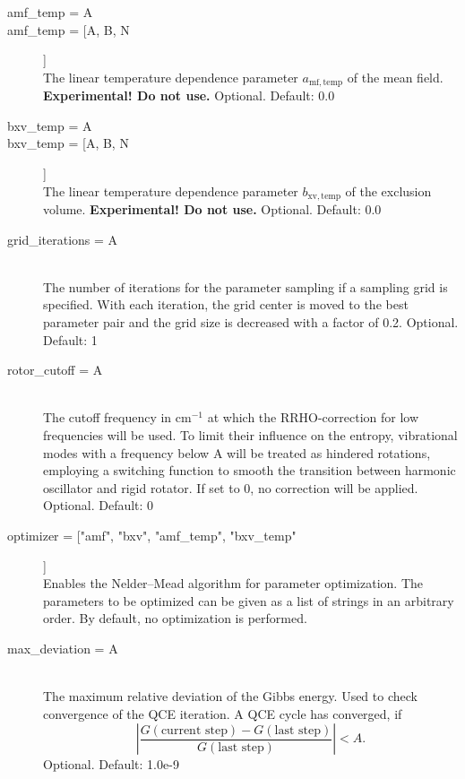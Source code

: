 \documentclass{scrartcl}
\begin{document}
\begin{description}
    \item[amf\_temp = A]
    \item[amf\_temp = [A, B, N]] \hfill \\
        The linear temperature dependence parameter $a_\mathrm{mf,temp}$ of the mean field.
        \textbf{Experimental! Do not use.}
        Optional. Default: 0.0
        \vspace{0.1cm}
    \item[bxv\_temp = A]
    \item[bxv\_temp = [A, B, N]] \hfill \\
        The linear temperature dependence parameter $b_\mathrm{xv,temp}$ of the exclusion volume.
        \textbf{Experimental! Do not use.}
        Optional. Default: 0.0
        \vspace{0.1cm}
    \item[grid\_iterations = A] \hfill \\
        The number of iterations for the parameter sampling if a sampling grid is specified.
        With each iteration, the grid center is moved to the best parameter pair and the grid size is decreased 
        with a factor of 0.2.
        Optional. Default: 1
    \item[rotor\_cutoff = A] \hfill \\
        The cutoff frequency in cm$^{-1}$ at which the RRHO-correction for low frequencies will be used.
        To limit their influence on the entropy, vibrational modes with a frequency below A will be treated as 
        hindered rotations, employing a switching function to smooth the transition between harmonic oscillator 
        and rigid rotator. If set to 0, no correction will be applied.
        Optional. Default: 0
    \item[optimizer = ["amf", "bxv", "amf\_temp", "bxv\_temp"]] \hfill \\
        Enables the Nelder--Mead algorithm for parameter optimization.
        The parameters to be optimized can be given as a list of strings in an arbitrary order.
        By default, no optimization is performed.
    \item[max\_deviation = A] \hfill \\
        The maximum relative deviation of the Gibbs energy.
        Used to check convergence of the QCE iteration.
        A QCE cycle has converged, if \[\left|\frac{G(\text{current step}) - G(\text{last step})}{G(\text{last step})}\right| < A.\]
        Optional. Default: 1.0e-9

\end{description}
\end{document}
